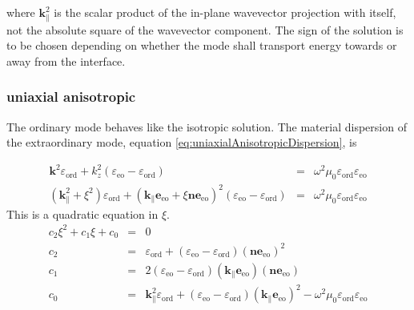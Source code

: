 \documentclass[12pt,a4paper,twoside,openright,BCOR10mm,headsepline,titlepage,abstracton,chapterprefix,final]{scrreprt}
\newcommand\Vector[1]{{\mathbf{#1}}}
\newcommand\vacuum{0}
\newcommand\wavenumber{k}
\newcommand\Wavevector{\Vector{\wavenumber}}
\newcommand\vacuumpermeability{\scalarpermeability_{\vacuum}}
\newcommand\scalarpermeability{\mu}
\newcommand\scalarpermittivity{\varepsilon}
\newcommand\ordi{\text{ord}}
\newcommand\eo{\text{eo}}
\begin{document}
where $\Wavevector_{\parallel}^2$ is the scalar product of the in-plane wavevector projection with itself, 
not the absolute square of the wavevector component.
The sign of the solution is to be chosen depending on whether the mode shall transport energy towards or away from the interface.

\subsubsection{uniaxial anisotropic}
The ordinary mode behaves like the isotropic solution.
The material dispersion of the extraordinary mode, equation \ref{eq:uniaxialAnisotropicDispersion}, is

\begin{eqnarray}
 \Wavevector^2 \scalarpermittivity_{\ordi} 
 + \wavenumber_{z}^2 (\scalarpermittivity_{\eo} - \scalarpermittivity_{\ordi})
 &=& \omega^2 \vacuumpermeability \scalarpermittivity_{\ordi} \scalarpermittivity_{\eo} 
 \label{eq:uniaxialDispersion}
 \\
 (\Wavevector_{\parallel}^2 + \xi^2) \scalarpermittivity_{\ordi} 
 + (\Wavevector_{\parallel} \Vector{e}_{\eo} + \xi \Vector{n}\Vector{e}_{\eo})^2 (\scalarpermittivity_{\eo} - \scalarpermittivity_{\ordi})
 &=& \omega^2 \vacuumpermeability \scalarpermittivity_{\ordi} \scalarpermittivity_{\eo}  
\end{eqnarray}
This is a quadratic equation in $\xi$.
\begin{eqnarray}
 c_2 \xi^2 + c_1 \xi + c_0 &=& 0
 \\
 c_2 &=& \scalarpermittivity_{\ordi} + (\scalarpermittivity_{\eo} - \scalarpermittivity_{\ordi}) (\Vector{n}\Vector{e}_{\eo})^2
 \nonumber 
 \\
 c_1 &=& 2 (\scalarpermittivity_{\eo} - \scalarpermittivity_{\ordi}) (\Wavevector_{\parallel} \Vector{e}_{\eo}) (\Vector{n}\Vector{e}_{\eo})
 \nonumber 
 \\
 c_0 &=& \Wavevector_{\parallel}^2 \scalarpermittivity_{\ordi} + (\scalarpermittivity_{\eo} - \scalarpermittivity_{\ordi}) (\Wavevector_{\parallel} \Vector{e}_{\eo})^2 
       - \omega^2 \vacuumpermeability \scalarpermittivity_{\ordi} \scalarpermittivity_{\eo} 
 \nonumber
\end{eqnarray}
\end{document}
